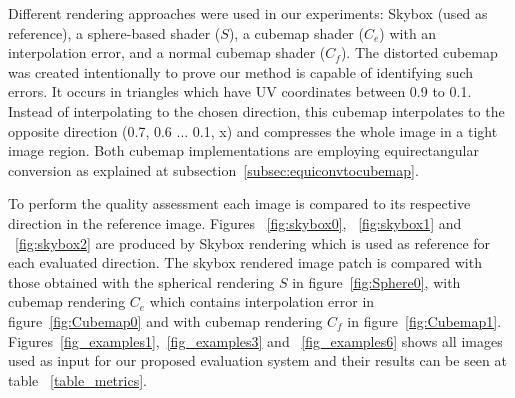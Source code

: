 \documentclass[10pt,conference,pdftex]{IEEEtran}
\begin{document}
\begin{table}[!t]
 \centering
    \caption{Metrics Results Example}
       \label{table_metrics}
\end{table}

Different rendering approaches were used in our experiments: Skybox (used as reference), a sphere-based shader ($S$), a cubemap shader ($C_e$) with an interpolation error, and a normal cubemap shader ($C_f$). The distorted cubemap was created intentionally to prove our method is capable of identifying such errors. It occurs in triangles which have UV coordinates between 0.9 to 0.1. Instead of interpolating to the chosen direction, this cubemap interpolates to the opposite direction (0.7, 0.6 ... 0.1, x) and compresses the whole image in a tight image region. Both cubemap implementations are employing equirectangular conversion as explained at subsection~\ref{subsec:equiconvtocubemap}.


To perform the quality assessment each image is compared to its respective direction in the reference image. Figures ~\ref{fig:skybox0}, ~\ref{fig:skybox1} and ~\ref{fig:skybox2} are produced by Skybox rendering which is used as reference for each evaluated direction. The skybox rendered image patch is compared with those obtained with the spherical rendering $S$ in figure~\ref{fig:Sphere0}, with cubemap rendering $C_e$ which contains interpolation error in figure~\ref{fig:Cubemap0} and with cubemap rendering $C_f$ in figure~\ref{fig:Cubemap1}.  Figures~\ref{fig_examples1},~\ref{fig_examples3} and ~\ref{fig_examples6} shows all images used as input for our proposed evaluation system and their results can be seen at table ~\ref{table_metrics}.
\end{document}
